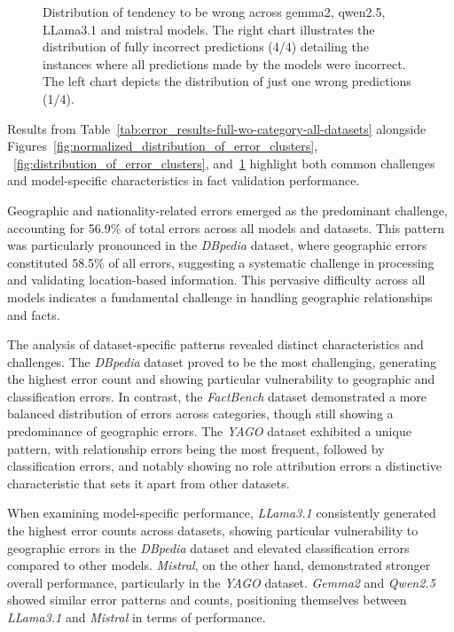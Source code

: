 \begin{figure}[ht!]
\begin{minipage}[b]{0.42\textwidth}
    \end{minipage}
    \caption{Distribution of tendency to be wrong across gemma2, qwen2.5, LLama3.1 and mistral models. The right chart illustrates the distribution of fully incorrect predictions (4/4) detailing the instances where all predictions made by the models were incorrect. The left chart depicts the distribution of just one wrong predictions (1/4).}
    \label{fig:distribution_of_error_clusters_1_4}
\end{figure}

Results from Table~\ref{tab:error_results-full-wo-category-all-datasets} alongside Figures~\ref{fig:normalized_distribution_of_error_clusters}, ~\ref{fig:distribution_of_error_clusters}, and~\ref{fig:distribution_of_error_clusters_1_4} highlight both common challenges and model-specific characteristics in fact validation performance.

Geographic and nationality-related errors emerged as the predominant challenge, accounting for 56.9\% of total errors across all models and datasets.
This pattern was particularly pronounced in the \textit{DBpedia} dataset, where geographic errors constituted 58.5\% of all errors, suggesting a systematic challenge in processing and validating location-based information.
This pervasive difficulty across all models indicates a fundamental challenge in handling geographic relationships and facts.

The analysis of dataset-specific patterns revealed distinct characteristics and challenges.
The \textit{DBpedia} dataset proved to be the most challenging, generating the highest error count and showing particular vulnerability to geographic and classification errors.
In contrast, the \textit{FactBench} dataset demonstrated a more balanced distribution of errors across categories, though still showing a predominance of geographic errors.
The \textit{YAGO} dataset exhibited a unique pattern, with relationship errors being the most frequent, followed by classification errors, and notably showing no role attribution errors a distinctive characteristic that sets it apart from other datasets.

When examining model-specific performance, \textit{LLama3.1} consistently generated the highest error counts across datasets, showing particular vulnerability to geographic errors in the \textit{DBpedia} dataset and elevated classification errors compared to other models.
\textit{Mistral}, on the other hand, demonstrated stronger overall performance, particularly in the \textit{YAGO} dataset.
\textit{Gemma2} and \textit{Qwen2.5} showed similar error patterns and counts, positioning themselves between \textit{LLama3.1} and \textit{Mistral} in terms of performance.

